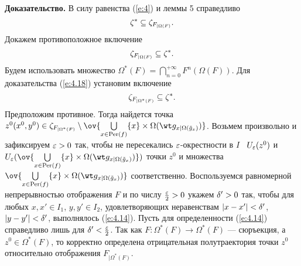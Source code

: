 {\bf Доказательство.} В силу равенства (\ref{e:4}) и
леммы 5 справедливо
\begin{equation}\label{e:4.17}
\zeta^*\subseteq\zeta_{F_{|\Omega(F)}}.
\end{equation}
Докажем противоположное включение
\begin{equation}\label{e:4.18}
\zeta_{F_{|\Omega(F)}}\subseteq\zeta^*.
\end{equation}
Будем использовать множество
$\Omega^*(F)=\bigcap\limits_{n=0}^{+\infty}F^n(\Omega(F))$.
Для доказательства (\ref{e:4.18}) установим включение
\begin{equation}\label{e:4.19}
\zeta_{F_{|\Omega^*(F)}}\subseteq\zeta^*.
\end{equation}
Предположим противное. Тогда найдется точка
$z^0(x^0, y^0)\in
\ze_{F_{|\Omega^*(F)}}\setminus
\ov{\bigcup\limits_{x\in \Per(f)}
\{x\}\times\Omega(\wt g_{x|\Omega(\Tilde g_x)})}$.
Возьмем произвольно и зафиксируем $\varepsilon>0$ так, чтобы не пересекались
$\varepsilon$-окрестности в $I$   \  $U_{\varepsilon}(z^0)$ и 
$U_{\e}(\ov{\bigcup\limits_{x\in \Per(f)}
\{x\}\times\Omega(\wt g_{x|\Omega(\Tilde g_x)})})$
точки $z^0$ и множества
$\ov{\bigcup\limits_{x\in \Per(f)}
\{x\}\times\Omega(\wt g_{x|\Omega(\Tilde g_x)})}$ соответственно.
Воспользуемся равномерной непрерывностью отображения $F$ и
по числу $\frac{\varepsilon}{2}> 0$ укажем $\delta'> 0$ так, чтобы для любых
$x, x'\in I_1$, $y, y'\in I_2$, удовлетворяющих
неравенствам $|x - x'|<\delta'$, $|y - y'|<\delta'$,
выполнялось (\ref{e:4.14}).
Пусть для определенности (\ref{e:4.14}) справедливо лишь
для $\delta'<\frac{\varepsilon}{2}$.
Так как $F:\Omega^*(F)\to\Omega^*(F)$ --- сюръекция, а
$z^0\in\Omega^*(F)$, то корректно определена отрицательная
полутраектория точки $z^0$ относительно отображения
$F_{|\Omega^{*}(F)}$.

